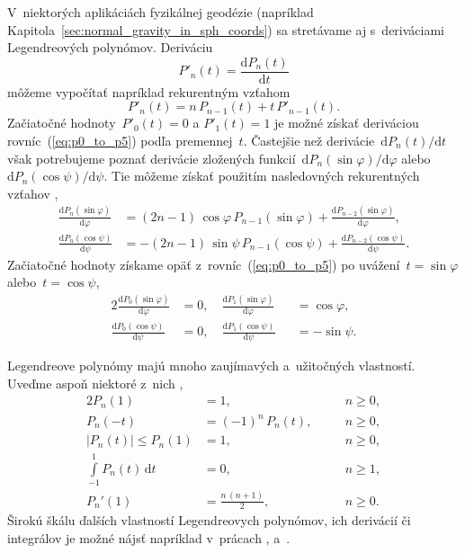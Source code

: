 \documentclass[a4paper, 12pt]{book}
\newcommand{\diff}{\mathrm d}
\begin{document}
V~niektorých aplikáciách fyzikálnej geodézie (napríklad 
Kapitola~\ref{sec:normal_gravity_in_sph_coords}) sa stretávame aj s~deriváciami 
Legendreových polynómov.  Deriváciu
%
\begin{equation}
P'_n(t) = \frac{\diff P_n(t)}{\diff t}
\end{equation}
%
môžeme vypočítať napríklad rekurentným vzťahom \parencite{Freeden2009}
%
\begin{equation}
P'_n(t) = n \, P_{n - 1}(t) + t \, P'_{n - 1}(t){.}
\end{equation}
%
Začiatočné hodnoty~$P'_0(t) = 0$ a $P'_1(t) = 1$ je možné získať deriváciou 
rovníc~(\ref{eq:p0_to_p5}) podľa premennej~$t$.  Častejšie než derivácie~$\diff 
P_n(t) \slash \diff t$ však potrebujeme poznať derivácie zložených 
funkcií~$\diff P_n(\sin\varphi) \slash \diff \varphi$ alebo~$\diff 
P_n(\cos\psi) \slash \diff \psi$.  Tie môžeme získať použitím nasledovných 
rekurentných vzťahov \parencite{Tscherning1976b},
%
\begin{align}
\label{eq:dlpsinphi_dphi}
\frac{\diff P_n(\sin\varphi)}{\diff \varphi} &= (2n - 1) \, \cos\varphi \, P_{n 
- 1}(\sin\varphi) + \frac{\diff P_{n - 2}(\sin\varphi)}{\diff \varphi}{,}\\
%
\label{eq:dlpcospsi_dpsi}
\frac{\diff P_n(\cos\psi)}{\diff \psi} &= -(2n - 1) \, \sin\psi \, P_{n 
- 1}(\cos\psi) + \frac{\diff P_{n - 2}(\cos\psi)}{\diff \psi}{.}
\end{align}
%
Začiatočné hodnoty získame opäť z~rovníc~(\ref{eq:p0_to_p5}) po uvážení~$t 
= \sin\varphi$ alebo~$t = \cos\psi$,
%
\begin{alignat}{2}
\frac{\diff P_0(\sin\varphi)}{\diff \varphi} &= 0{,} \quad \frac{\diff 
P_1(\sin\varphi)}{\diff \varphi} &&= \cos\varphi{,}\\
%
\frac{\diff P_0(\cos\psi)}{\diff \psi} &= 0{,} \quad \frac{\diff 
P_1(\cos\psi)}{\diff \psi} &&= -\sin\psi{.}
\end{alignat}

Legendreove polynómy majú mnoho zaujímavých a~užitočných vlastností.  Uveďme 
aspoň niektoré z~nich \parencite{Freeden2009},
%
\begin{alignat}{2}
\label{eq:pn_property1}
P_n(1) &= 1{,} && \quad n \geq 0{,}\\
%
\label{eq:pn_property2}
P_n(-t) &= (-1)^n \, P_n(t){,} && \quad n \geq 0{,}\\
%
\label{eq:pn_property3}
|P_n(t)| \leq P_n(1) &= 1{,} && \quad n \geq 0{,}\\
%
\int\limits_{-1}^{1} P_n(t) \, \diff t &= 0{,} && \quad n \geq 1{,}\\
%
\label{eq:pn_property4}
P_n'(1) &= \frac{n \, (n + 1)}{2}{,} && \quad n \geq 0{.}
\end{alignat}
%
Širokú škálu ďalších vlastností Legendreovych polynómov, ich derivácií či 
integrálov je možné nájsť napríklad v~prácach \textcite{Gradshteyn2007}, 
\textcite{Freeden2009} a~\textcite{Olver2010}.
\end{document}
